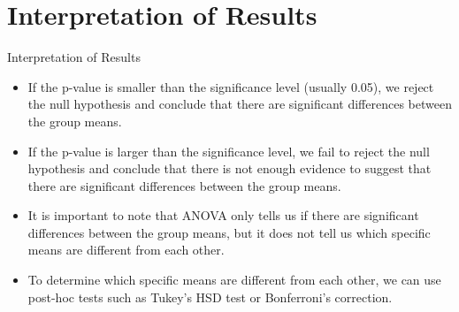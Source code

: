 \documentclass{beamer}
\begin{document}
\section{Interpretation of Results}
\begin{frame}{Interpretation of Results}
\begin{itemize}
    \item If the p-value is smaller than the significance level (usually 0.05), we reject the null hypothesis and conclude that there are significant differences between the group means.
    \item If the p-value is larger than the significance level, we fail to reject the null hypothesis and conclude that there is not enough evidence to suggest that there are significant differences between the group means.
    \item It is important to note that ANOVA only tells us if there are significant differences between the group means, but it does not tell us which specific means are different from each other.
    \item To determine which specific means are different from each other, we can use post-hoc tests such as Tukey's HSD test or Bonferroni's correction.
\end{itemize}
\end{frame}
\end{document}
